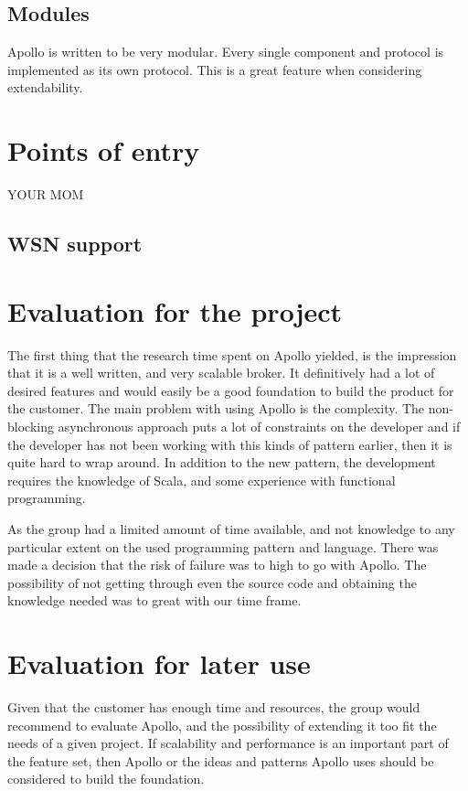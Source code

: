 \subsection{Modules}
Apollo is written to be very modular. Every single component and protocol is implemented as its own protocol. This is a great feature when considering extendability. 

\section{Points of entry}
YOUR MOM

\subsection{WSN support}

\section{Evaluation for the project}
The first thing that the research time spent on Apollo yielded, is the impression that it is a well written, and very scalable broker.
It definitively had a lot of desired features and would easily be a good foundation to build the product for the customer. The main problem with using Apollo is the complexity. The non-blocking asynchronous approach puts a lot of constraints on the developer and if the developer has not been working with this kinds of pattern earlier, then it is quite hard to wrap around. In addition to the new pattern, the development requires the knowledge of Scala, and some experience with functional programming. 

As the group had a limited amount of time available, and not knowledge to any particular extent on the used programming pattern and language. There was made a decision that the risk of failure was to high to go with Apollo. The possibility of not getting through even the source code and obtaining the knowledge needed was to great with our time frame. 

\section{Evaluation for later use}
Given that the customer has enough time and resources, the group would recommend to evaluate Apollo, and the possibility of extending it too fit the needs of a given project. If scalability and performance is an important part of the feature set, then Apollo or the ideas and patterns Apollo uses should be considered to build the foundation.

\clearpage

